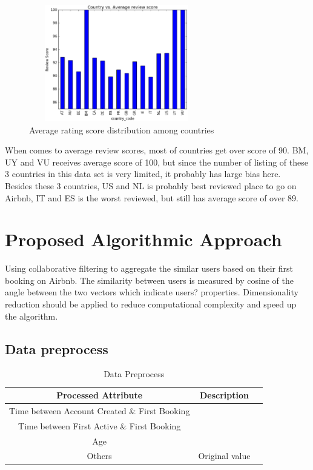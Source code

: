 \documentclass{sig-alternate-05-2015}
\begin{document}
\begin{figure}
\centering
\includegraphics[height=2in, width=3in]{country-avgRating}
\caption{Average rating score distribution among countries}
\end{figure}

When comes to average review scores, most of countries get over score of 90. BM, UY and VU receives average score of 100, but since the number of listing of these 3 countries in this data set is very limited, it probably has large bias here. Besides these 3 countries, US and NL is probably best reviewed place to go on Airbnb, IT and ES is the worst reviewed, but still has average score of over 89.

\FloatBarrier
\section{Proposed Algorithmic Approach}
Using collaborative filtering to aggregate the similar users based on their first booking on Airbnb. The similarity between users is measured by cosine of the angle between the two vectors which indicate users? properties. Dimensionality reduction should be applied to reduce computational complexity and speed up the algorithm.

\subsection{Data preprocess}

\begin{table}[!htb]
\centering
\caption{Data Preprocess}
\label{table:preprocess}
\begin{tabular}{|c|c|l|} \hline
Processed Attribute & Description\\ \hline
Time between Account Created \& First Booking &  \\ \hline
Time between First Active \& First Booking &  \\ \hline
Age &  \\ \hline
Others & Original value \\
\hline\end{tabular}
\end{table}
\end{document}
